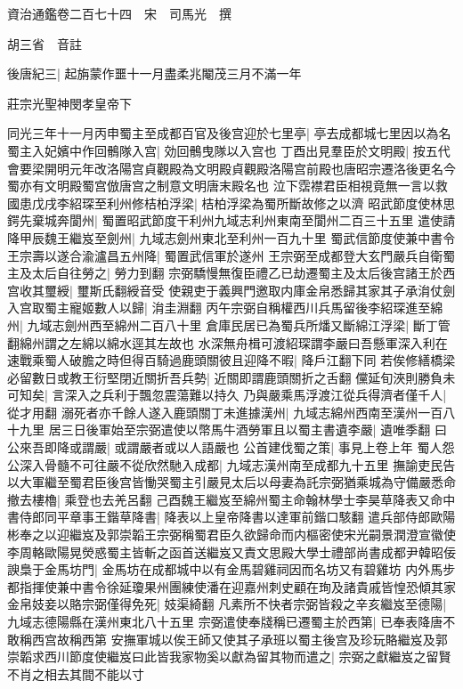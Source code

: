 資治通鑑卷二百七十四　宋　司馬光　撰

胡三省　音註

後唐紀三|{
	起旃蒙作噩十一月盡柔兆閹茂三月不滿一年}


莊宗光聖神閔孝皇帝下

同光三年十一月丙申蜀主至成都百官及後宫迎於七里亭|{
	亭去成都城七里因以為名}
蜀主入妃嬪中作回鶻隊入宫|{
	効回鶻曳隊以入宫也}
丁酉出見羣臣於文明殿|{
	按五代會要梁開明元年改洛陽宫貞觀殿為文明殿貞觀殿洛陽宫前殿也唐昭宗遷洛後更名今蜀亦有文明殿蜀宫倣唐宫之制意文明唐末殿名也}
泣下霑襟君臣相視竟無一言以救國患戊戌李紹琛至利州修桔柏浮梁|{
	桔柏浮梁為蜀所斷故修之以濟}
昭武節度使林思鍔先棄城奔閬州|{
	蜀置昭武節度干利州九域志利州東南至閬州二百三十五里}
遣使請降甲辰魏王繼岌至劍州|{
	九域志劍州東北至利州一百九十里}
蜀武信節度使兼中書令王宗壽以遂合渝瀘昌五州降|{
	蜀置武信軍於遂州}
王宗弼至成都登大玄門嚴兵自衛蜀主及太后自往勞之|{
	勞力到翻}
宗弼驕慢無復臣禮乙已劫遷蜀主及太后後宫諸王於西宫收其璽綬|{
	璽斯氏翻綬音受}
使親吏于義興門邀取内庫金帛悉歸其家其子承㳙仗劍入宫取蜀主寵姬數人以歸|{
	㳙圭淵翻}
丙午宗弼自稱權西川兵馬留後李紹琛進至綿州|{
	九域志劍州西至綿州二百八十里}
倉庫民居已為蜀兵所燔又斷綿江浮梁|{
	斷丁管翻綿州謂之左綿以綿水逕其左故也}
水深無舟楫可渡紹琛謂李嚴曰吾懸軍深入利在速戰乘蜀人破膽之時但得百騎過鹿頭關彼且迎降不暇|{
	降戶江翻下同}
若俟修繕橋梁必留數日或教王衍堅閉近關折吾兵勢|{
	近關即謂鹿頭關折之舌翻}
儻延旬浹則勝負未可知矣|{
	言深入之兵利于飄忽震蕩難以持久}
乃與嚴乘馬浮渡江從兵得濟者僅千人|{
	從才用翻}
溺死者亦千餘人遂入鹿頭關丁未進據漢州|{
	九域志綿州西南至漢州一百八十九里}
居三日後軍始至宗弼遣使以幣馬牛酒勞軍且以蜀主書遺李嚴|{
	遺唯季翻}
曰公來吾即降或謂嚴|{
	或謂嚴者或以人語嚴也}
公首建伐蜀之策|{
	事見上卷上年}
蜀人怨公深入骨髓不可往嚴不從欣然馳入成都|{
	九域志漢州南至成都九十五里}
撫諭吏民告以大軍繼至蜀君臣後宫皆慟哭蜀主引嚴見太后以母妻為託宗弼猶乘城為守備嚴悉命撤去樓櫓|{
	乘登也去羌呂翻}
己酉魏王繼岌至綿州蜀主命翰林學士李昊草降表又命中書侍郎同平章事王鍇草降書|{
	降表以上皇帝降書以達軍前鍇口駭翻}
遣兵部侍郎歐陽彬奉之以迎繼岌及郭崇韜王宗弼稱蜀君臣久欲歸命而内樞密使宋光嗣景潤澄宣徽使李周輅歐陽晃熒惑蜀主皆斬之函首送繼岌又責文思殿大學士禮部尚書成都尹韓昭佞諛梟于金馬坊門|{
	金馬坊在成都城中以有金馬碧雞祠因而名坊又有碧雞坊}
内外馬步都指揮使兼中書令徐延瓊果州團練使潘在迎嘉州刺史顧在珣及諸貴戚皆惶恐傾其家金帛妓妾以賂宗弼僅得免死|{
	妓渠綺翻}
凡素所不快者宗弼皆殺之辛亥繼岌至德陽|{
	九域志德陽縣在漢州東北八十五里}
宗弼遣使奉牋稱已遷蜀主於西第|{
	已奉表降唐不敢稱西宫故稱西第}
安撫軍城以俟王師又使其子承班以蜀主後宫及珍玩賂繼岌及郭崇韜求西川節度使繼岌曰此皆我家物奚以獻為留其物而遣之|{
	宗弼之獻繼岌之留賢不肖之相去其間不能以寸}
